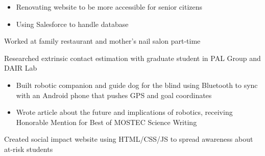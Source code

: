 \documentclass[9pt,letterpaper,ragged2e,withhyper]{altacv}
\begin{document}
\begin{paracol}{2}

\begin{itemize}
    \item Renovating website to be more accessible for senior citizens
    \item Using Salesforce to handle database
\end{itemize}

\divider

Worked at family restaurant and mother's nail salon part-time


\switchcolumn


Researched extrinsic contact estimation with graduate student in PAL Group and DAIR Lab

\divider

\begin{itemize}
    \item Built robotic companion and guide dog for the blind using Bluetooth to sync with an Android phone that pushes GPS and goal coordinates
    \item Wrote article about the future and implications of robotics, receiving Honorable Mention for Best of MOSTEC Science Writing
\end{itemize}

\divider

Created social impact website using HTML/CSS/JS to spread awareness about at-risk students



\divider


\divider



\end{paracol}
\end{document}
